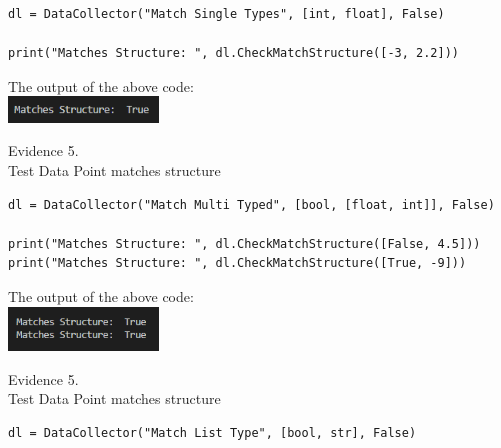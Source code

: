 \begin{flushleft}
\begin{center}
        \begin{verbatim}
dl = DataCollector("Match Single Types", [int, float], False)

print("Matches Structure: ", dl.CheckMatchStructure([-3, 2.2]))
        \end{verbatim}

        The output of the above code: \\
        \includegraphics[width=4cm]{Images/Testing/T4.3.1.PNG} \\
        \vspace{1cm}

        {\large Evidence 5.\rn } \\ 
        \vspace{0.3cm}
        Test Data Point matches structure \\

        \begin{verbatim}
dl = DataCollector("Match Multi Typed", [bool, [float, int]], False)

print("Matches Structure: ", dl.CheckMatchStructure([False, 4.5]))
print("Matches Structure: ", dl.CheckMatchStructure([True, -9]))
        \end{verbatim}
            
        The output of the above code: \\
        \includegraphics[width=4cm]{Images/Testing/T4.4.1.PNG} \\
        \vspace{1cm}

        {\large Evidence 5.\rn } \\ 
        \vspace{0.3cm}
        Test Data Point matches structure \\

        \begin{verbatim}
dl = DataCollector("Match List Type", [bool, str], False)


\end{verbatim}
\end{center}
\end{flushleft}
